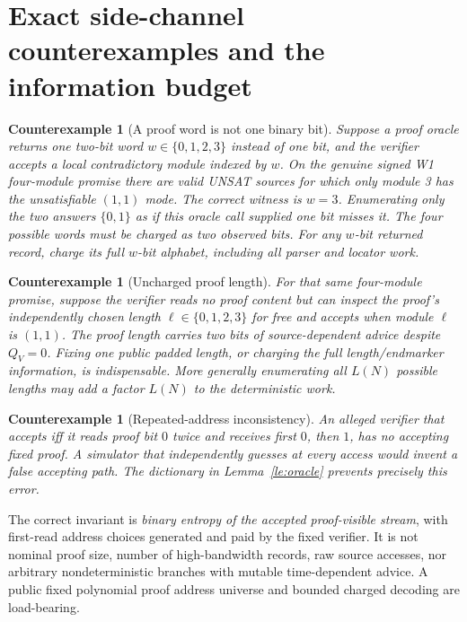 \documentclass[11pt]{article}
\newtheorem{counterexample}[theorem]{Counterexample}
\begin{document}
\section{Exact side-channel counterexamples and the information budget}
\begin{counterexample}[A proof word is not one binary bit]
Suppose a proof oracle returns one \emph{two-bit word}
$w\in\{0,1,2,3\}$ instead of one bit, and the verifier
accepts a local contradictory module indexed by $w$.
On the genuine signed W1 four-module promise there
are valid UNSAT sources for which \emph{only module 3}
has the unsatisfiable $(1,1)$ mode.
The correct witness is $w=3$. Enumerating only the
two answers $\{0,1\}$ as if this oracle call supplied
one bit misses it. The four possible words must be
charged as \emph{two} observed bits. For any
$w$-bit returned record, charge its full $w$-bit
alphabet, including all parser and locator work.
\end{counterexample}
\begin{counterexample}[Uncharged proof length]
For that same four-module promise, suppose the
verifier reads \emph{no proof content} but can
inspect the proof's independently chosen length
$\ell\in\{0,1,2,3\}$ for free and accepts when
module $\ell$ is $(1,1)$. The proof length carries
two bits of source-dependent advice despite
$Q_V=0$. Fixing one public padded length, or
charging the full length/endmarker information,
is indispensable. More generally enumerating
all $L(N)$ possible lengths may add a factor
$L(N)$ to the deterministic work.
\end{counterexample}
\begin{counterexample}[Repeated-address inconsistency]
An alleged verifier that accepts iff it reads
proof bit $0$ twice and receives first $0$, then
$1$, has \emph{no} accepting \emph{fixed proof}.
A simulator that independently guesses at every
access would invent a false accepting path.
The dictionary in Lemma~\ref{le:oracle}
prevents precisely this error.
\end{counterexample}

The correct invariant is \emph{binary entropy of
the accepted proof-visible stream}, with first-read
address choices generated and paid by the fixed
verifier. It is not nominal proof size, number of
high-bandwidth records, raw source accesses, nor
arbitrary nondeterministic branches with mutable
time-dependent advice. A public fixed polynomial
proof address universe and bounded charged decoding
are load-bearing.
\end{document}
